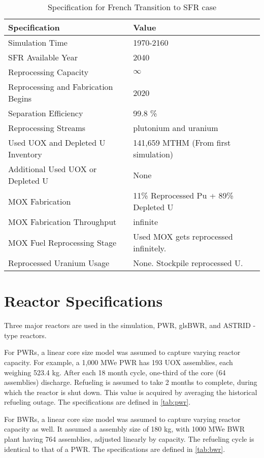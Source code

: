 \begin{table}[h]
	\centering
	\begin{tabularx}{\textwidth}{bb}
		\hline
		Specification & Value \\
		\hline
		Simulation Time & 1970-2160 \\
		\gls{SFR} Available Year & 2040 \\
		Reprocessing Capacity & $\infty$ \\
		Reprocessing and Fabrication Begins & 2020 \\
		Separation Efficiency & 99.8 \% \\
		Reprocessing Streams & plutonium and uranium \\
		\small{Used \gls{UOX} and Depleted U Inventory} & 141,659 MTHM {\small (From first simulation)} \\
		\small{Additional Used \gls{UOX} or Depleted U} & None  \\
		\gls{MOX} Fabrication &  \small{11\% Reprocessed Pu + 89\% Depleted U}  \\
		\gls{MOX} Fabrication Throughput & infinite \\
		\gls{MOX} Fuel Reprocessing Stage &  Used \gls{MOX} gets reprocessed infinitely. \\
		Reprocessed Uranium Usage &  None. Stockpile reprocessed U. \\
		\hline
	\end{tabularx}
	\caption {Specification for French Transition to \gls{SFR} case }
	\label{tab:sim_france}
\end{table}


\section{Reactor Specifications}
Three major reactors are used in the simulation, \gls{PWR}, gls{BWR}, and ASTRID - type reactors.

For \glspl{PWR}, a linear core size model was assumed to capture
varying reactor capacity. For example, a 
1,000 MWe PWR has 193 \gls{UOX} assemblies, each
weighing 523.4 kg.
After each 18 month cycle, one-third of the 
core (64 assemblies) discharge. Refueling
is assumed to take 2 months to complete, during which the reactor
is shut down. This value is acquired by averaging the 
historical refueling outage. The specifications are defined in \cref{tab:pwr}.

For \glspl{BWR}, a linear core size model was assumed to capture
varying reactor capacity as well. It assumed a assembly size of
180 kg, with 1000 MWe BWR plant having 764 assemblies, adjusted
linearly by capacity. The refueling cycle is identical to that
of a \gls{PWR}. The specifications are defined in \cref{tab:bwr}.


